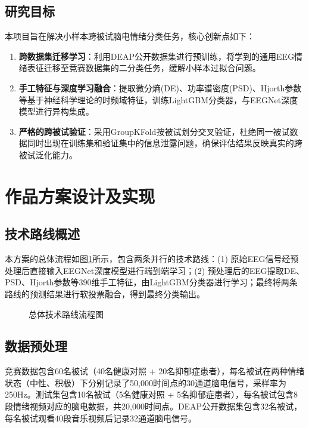 \documentclass[UTF8,zihao=-4,fontset=fandol]{ctexart}
\numberwithin{equation}{section}
\numberwithin{figure}{section}
\numberwithin{table}{section}
\begin{document}
\subsection{研究目标}

本项目旨在解决小样本跨被试脑电情绪分类任务，核心创新点如下：

\begin{enumerate}
    \item \textbf{跨数据集迁移学习}：利用DEAP公开数据集进行预训练，将学到的通用EEG情绪表征迁移至竞赛数据集的二分类任务，缓解小样本过拟合问题。
    \item \textbf{手工特征与深度学习融合}：提取微分熵(DE)、功率谱密度(PSD)、Hjorth参数等基于神经科学理论的时频域特征，训练LightGBM分类器，与EEGNet深度模型进行异构集成。
    \item \textbf{严格的跨被试验证}：采用GroupKFold按被试划分交叉验证，杜绝同一被试数据同时出现在训练集和验证集中的信息泄露问题，确保评估结果反映真实的跨被试泛化能力。
\end{enumerate}

\section{作品方案设计及实现}

\subsection{技术路线概述}

本方案的总体流程如图\ref{fig:pipeline}所示，包含两条并行的技术路线：(1) 原始EEG信号经预处理后直接输入EEGNet深度模型进行端到端学习；(2) 预处理后的EEG提取DE、PSD、Hjorth参数等390维手工特征，由LightGBM分类器进行学习；最终将两条路线的预测结果进行软投票融合，得到最终分类输出。

\begin{figure}[htbp]
\centering
\fbox{\rule{0pt}{4cm}\rule{14cm}{0pt}}
\caption{总体技术路线流程图}
\label{fig:pipeline}
\end{figure}

\subsection{数据预处理}

竞赛数据包含60名被试（40名健康对照 + 20名抑郁症患者），每名被试在两种情绪状态（中性、积极）下分别记录了50,000时间点的30通道脑电信号，采样率为250Hz。测试集包含10名被试（5名健康对照 + 5名抑郁症患者），每名被试包含8段情绪视频对应的脑电数据，共20,000时间点。DEAP公开数据集包含32名被试，每名被试观看40段音乐视频后记录32通道脑电信号。
\end{document}
